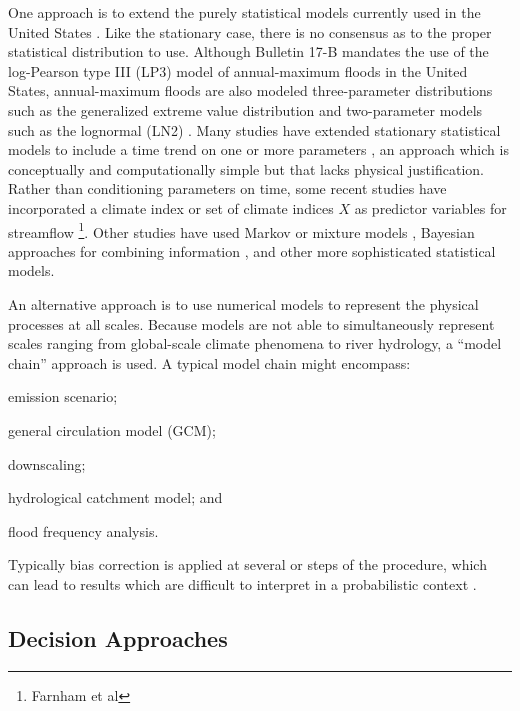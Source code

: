 \documentclass[11pt]{article}
\begin{document}
One approach is to extend the purely statistical models currently used in the United States \citep{IACWD1982}.
Like the stationary case, there is no consensus as to the proper statistical distribution to use.
Although Bulletin 17-B \citep{IACWD1982} mandates the use of the log-Pearson type III (LP3) model of annual-maximum floods in the United States, annual-maximum floods are also modeled three-parameter distributions such as the generalized extreme value distribution and two-parameter models such as the lognormal (LN2) \citep{Vogel1996}.
Many studies have extended stationary statistical models to include a time trend on one or more parameters \citep{Obeysekera2014,Vogel2011,Serinaldi2015,Strupczewski2001}, an approach which is conceptually and computationally simple but that lacks physical justification.
Rather than conditioning parameters on time, some recent studies have incorporated a climate index or set of climate indices \(X\) as predictor variables for streamflow \citep{Delgado2014,Silva2016,Sun2014,Griffis2007}\footnote{Farnham et al}.
Other studies have used Markov or mixture models \citep{Waylen1986,Sveinsson2005,Griffis2007}, Bayesian approaches for combining information \citep{Lima2016,Bracken2017}, and other more sophisticated statistical models.

An alternative approach is to use numerical models to represent the physical processes at all scales.
Because models are not able to simultaneously represent scales ranging from global-scale climate phenomena to river hydrology, a ``model chain'' approach is used.
A typical model chain might encompass:
\begin{enumerate*}[label= (\roman*) ]
  \item emission scenario;
  \item general circulation model (GCM);
  \item downscaling;
  \item hydrological catchment model; and
  \item flood frequency analysis.
\end{enumerate*}
Typically bias correction is applied at several or steps of the procedure, which can lead to results which are difficult to interpret in a probabilistic context \citep{Dankers2009,Ott2013,Merz2014,Dittes2017}.

\subsection{Decision Approaches}
\end{document}
